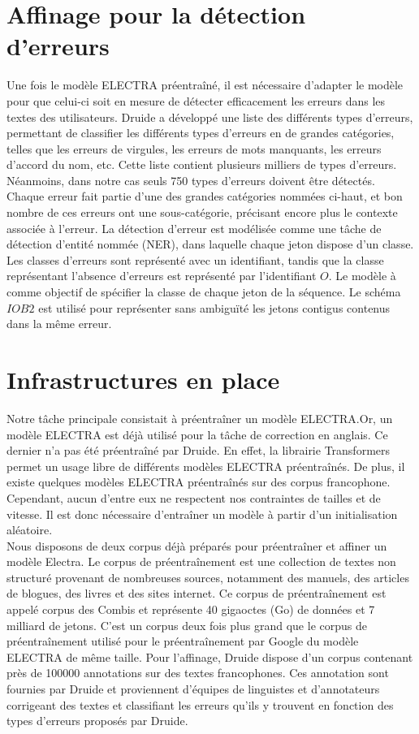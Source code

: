\documentclass[12pt,twoside,maitrise]{dms}
\theoremstyle{definition}
\numberwithin{equation}{section}
\numberwithin{table}{chapter}
\numberwithin{figure}{chapter}
\begin{document}
\section{Affinage pour la détection d'erreurs}
Une fois le modèle ELECTRA préentraîné, il est nécessaire d'adapter le modèle
pour que celui-ci soit en mesure de détecter efficacement les erreurs dans les
textes des utilisateurs. Druide a développé une liste des différents types
d'erreurs, permettant de classifier les différents types d'erreurs en de
grandes catégories, telles que les erreurs de virgules, les erreurs de mots
manquants, les erreurs d'accord du nom, etc. Cette liste contient plusieurs
milliers de types d'erreurs. Néanmoins, dans notre cas seuls 750 types
d'erreurs doivent être détectés. Chaque erreur fait partie d'une des grandes
catégories nommées ci-haut, et bon nombre de ces erreurs ont une
sous-catégorie, précisant encore plus le contexte associée à l'erreur. La
détection d'erreur est modélisée comme une tâche de détection d'entité nommée
(NER), dans laquelle chaque jeton dispose d'un classe. Les classes d'erreurs
sont représenté avec un identifiant, tandis que la classe représentant
l'absence d'erreurs est représenté par l'identifiant $O$. Le modèle à comme
objectif de spécifier la classe de chaque jeton de la séquence. Le schéma
$IOB2$ \cite{schemas} est utilisé pour représenter sans ambiguïté les jetons
contigus contenus dans la même erreur.

\section{Infrastructures en place}
Notre tâche principale consistait à préentraîner un modèle ELECTRA.\@ Or, un
modèle ELECTRA est déjà utilisé pour la tâche de correction en anglais. Ce
dernier n'a pas été préentraîné par Druide. En effet, la librairie
Transformers\cite{wolf-etal-2020-transformers} permet un usage libre de
différents modèles ELECTRA préentraînés. De plus, il existe quelques modèles
ELECTRA préentraînés sur des corpus francophone. Cependant, aucun d'entre eux
ne respectent nos contraintes de tailles et de vitesse. Il est donc nécessaire
d'entraîner un modèle à partir d'un initialisation aléatoire.
\\

Nous disposons de deux corpus déjà préparés pour préentraîner et affiner un
modèle Electra. Le corpus de préentraînement est une collection de textes non
structuré provenant de nombreuses sources, notamment des manuels, des articles
de blogues, des livres et des sites internet. Ce corpus de préentraînement est
appelé corpus des Combis et représente 40 gigaoctes (Go) de données et 7
milliard de jetons. C'est un corpus deux fois plus grand que le corpus de
préentraînement utilisé pour le préentraînement par Google du modèle ELECTRA de
même taille. Pour l'affinage, Druide dispose d'un corpus contenant près de
100000 annotations sur des textes francophones. Ces annotation sont fournies
par Druide et proviennent d'équipes de linguistes et d'annotateurs corrigeant
des textes et classifiant les erreurs qu'ils y trouvent en fonction des types
d'erreurs proposés par Druide.
\end{document}
